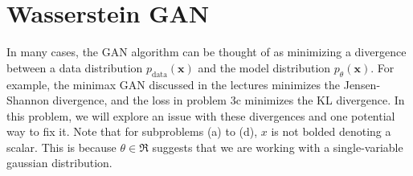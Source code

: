 \section{Wasserstein GAN}

In many cases, the GAN algorithm can be thought of as minimizing a divergence between a data distribution 
$p_{\text{data}}(\bm{x})$ and the model distribution $p_{\theta}(\bm{x})$. For example, the minimax GAN discussed 
in the lectures minimizes the Jensen-Shannon divergence, and the loss in problem 3c minimizes the KL divergence. 
In this problem, we will explore an issue with these divergences and one potential way to fix it. Note that for subproblems
(a) to (d), $x$ is not bolded denoting a scalar. This is because $\theta \in \Re$ suggests that we are working with a 
single-variable gaussian distribution.

